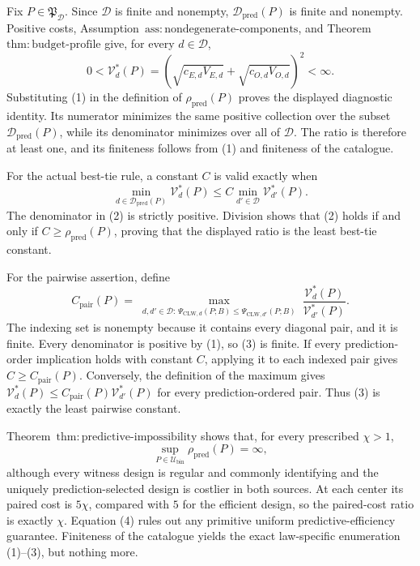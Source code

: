 Fix \(P\in\mathfrak P_{\mathcal D}\). Since \(\mathcal D\) is finite and nonempty, \(\mathcal D_{\mathrm{pred}}(P)\) is finite and nonempty. Positive costs, Assumption~\(\mathrm{ass{:}nondegenerate\text{-}components}\), and Theorem~\(\mathrm{thm{:}budget\text{-}profile}\) give, for every \(d\in\mathcal D\),
\[
 0<\mathcal V_d^*(P)
 =\left(\sqrt{c_{E,d}V_{E,d}}+
         \sqrt{c_{O,d}V_{O,d}}\right)^2<\infty.       \tag{1}
\]
Substituting (1) in the definition of \(\rho_{\mathrm{pred}}(P)\) proves the displayed diagnostic identity. Its numerator minimizes the same positive collection over the subset \(\mathcal D_{\mathrm{pred}}(P)\), while its denominator minimizes over all of \(\mathcal D\). The ratio is therefore at least one, and its finiteness follows from (1) and finiteness of the catalogue.

For the actual best-tie rule, a constant \(C\) is valid exactly when
\[
 \min_{d\in\mathcal D_{\mathrm{pred}}(P)}\mathcal V_d^*(P)
 \le C\min_{d'\in\mathcal D}\mathcal V_{d'}^*(P).    \tag{2}
\]
The denominator in (2) is strictly positive. Division shows that (2) holds if and only if \(C\ge\rho_{\mathrm{pred}}(P)\), proving that the displayed ratio is the least best-tie constant.

For the pairwise assertion, define
\[
 C_{\mathrm{pair}}(P)=
 \max_{\substack{d,d'\in\mathcal D:\,
 \Psi_{\mathrm{CLW},d}(P;B)
 \le\Psi_{\mathrm{CLW},d'}(P;B)}}
 \frac{\mathcal V_d^*(P)}{\mathcal V_{d'}^*(P)}.      \tag{3}
\]
The indexing set is nonempty because it contains every diagonal pair, and it is finite. Every denominator is positive by (1), so (3) is finite. If every prediction-order implication holds with constant \(C\), applying it to each indexed pair gives \(C\ge C_{\mathrm{pair}}(P)\). Conversely, the definition of the maximum gives \(\mathcal V_d^*(P)\le C_{\mathrm{pair}}(P)\mathcal V_{d'}^*(P)\) for every prediction-ordered pair. Thus (3) is exactly the least pairwise constant.

Theorem~\(\mathrm{thm{:}predictive\text{-}impossibility}\) shows that, for every prescribed \(\chi>1\),
\[
 \sup_{P\in\mathcal U_{\mathrm{bin}}}\rho_{\mathrm{pred}}(P)=\infty, \tag{4}
\]
although every witness design is regular and commonly identifying and the uniquely prediction-selected design is costlier in both sources. At each center its paired cost is \(5\chi\), compared with \(5\) for the efficient design, so the paired-cost ratio is exactly \(\chi\). Equation (4) rules out any primitive uniform predictive-efficiency guarantee. Finiteness of the catalogue yields the exact law-specific enumeration (1)--(3), but nothing more.